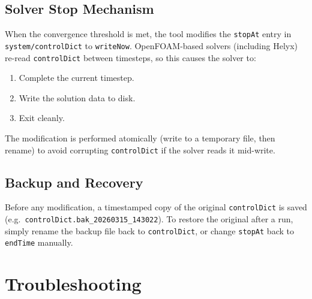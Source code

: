 \documentclass[12pt]{article}
\begin{document}
\subsection{Solver Stop Mechanism}

When the convergence threshold is met, the tool modifies the \texttt{stopAt} entry in \texttt{system/controlDict} to \texttt{writeNow}. OpenFOAM-based solvers (including Helyx) re-read \texttt{controlDict} between timesteps, so this causes the solver to:

\begin{enumerate}[nosep]
    \item Complete the current timestep.
    \item Write the solution data to disk.
    \item Exit cleanly.
\end{enumerate}

The modification is performed atomically (write to a temporary file, then rename) to avoid corrupting \texttt{controlDict} if the solver reads it mid-write.

\subsection{Backup and Recovery}

Before any modification, a timestamped copy of the original \texttt{controlDict} is saved (e.g.\ \texttt{controlDict.bak\_20260315\_143022}). To restore the original after a run, simply rename the backup file back to \texttt{controlDict}, or change \texttt{stopAt} back to \texttt{endTime} manually.

\section{Troubleshooting}
\end{document}
